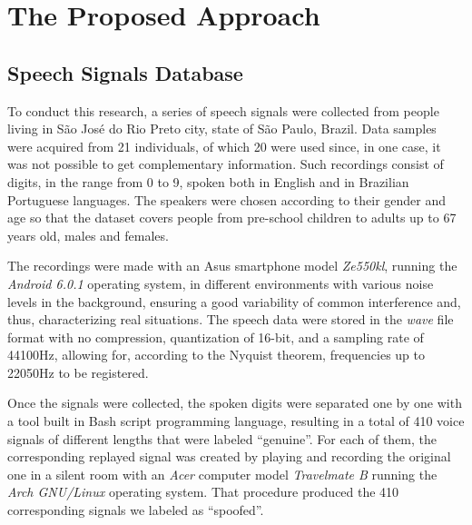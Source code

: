 \section{The Proposed Approach}
	\label{sec:propApproach}
	\subsection{Speech Signals Database}
		\par To conduct this research, a series of speech signals were collected from people living in São José do Rio Preto city, state of São Paulo, Brazil. Data samples were acquired from 21 individuals, of which 20 were used since, in one case, it was not possible to get complementary information. Such recordings consist of digits, in the range from 0 to 9, spoken both in English and in Brazilian Portuguese languages. The speakers were chosen according to their gender and age so that the dataset covers people from pre-school children to adults up to 67 years old, males and females.
		\\
		\par The recordings were made with an Asus smartphone model \textit{Ze550kl}, running the \textit{Android 6.0.1} operating system, in different environments with various noise levels in the background, ensuring a good variability of common interference and, thus, characterizing real situations. The speech data were stored in the \textit{wave} file format with no compression, quantization of 16-bit, and a sampling rate of 44100Hz, allowing for, according to the Nyquist theorem, frequencies up to 22050Hz to be registered.
		\\
		\par Once the signals were collected, the spoken digits were separated one by one with a tool built in Bash script programming language, resulting in a total of 410 voice signals of different lengths that were labeled ``genuine''. For each of them, the corresponding replayed signal was created by playing and recording the original one in a silent room with an \textit{Acer} computer model \textit{Travelmate B} running the \textit{Arch GNU/Linux} operating system. That procedure produced the 410 corresponding signals we labeled as ``spoofed''.
